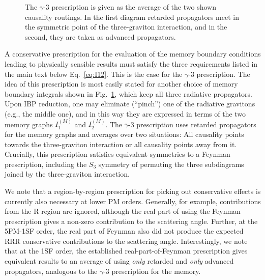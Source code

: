 \documentclass[twocolumn,superscriptaddress,amsmath, amssymb, amsfonts,preprintnumbers,aps,prd,longbibliography,nofootinbib]{revtex4-2}
\begin{document}
\begin{widetext}
\begin{figure}[t!]
\caption{
  The $\gamma$-$3$ prescription is given as the average of the two shown causality routings.
  In the first diagram retarded propagators meet in the symmetric point of the three-graviton interaction, and in the second, they are taken as advanced propagators.
  }
\label{fig:g3pres}
\end{figure}
A conservative prescription for the evaluation of the memory boundary conditions leading to physically sensible results must satisfy the three requirements listed in the main text below Eq.~\eqref{eq:I12}.
This is the case for the $\gamma$-3 prescription.
The idea of this prescription is most easily stated for another choice of memory boundary integrals shown in Fig.~\ref{fig:g3pres}, which keep all three radiative propagators.
Upon IBP reduction, one may eliminate (``pinch'') one of the radiative gravitons (e.g., the middle one), and in this way they are expressed in terms of the two memory graphs $I^{(M)}_1$ and $I^{(M)}_2$.
The $\gamma$-3 prescription uses retarded propagators for the memory graphs and averages over two situations: All causality points towards the three-graviton interaction or all causality points away from it.
Crucially, this prescription satisfies equivalent symmetries to a Feynman prescription, including the $S_3$ symmetry of permuting the three subdiagrams joined by the three-graviton interaction.

We note that a region-by-region prescription for picking out conservative effects is currently also necessary at lower PM orders.
Generally, for example, contributions from the R region are ignored, although the real part of using the Feynman prescription gives a non-zero contribution to the scattering angle.
Further, at the 5PM-1SF order, the real part of Feynman also did not produce the expected RRR conservative contributions to the scattering angle.
Interestingly, we note that at the 1SF order, the established real-part-of-Feynman prescription gives equivalent results to an average of using \textit{only} retarded and \textit{only} advanced propagators, analogous to the $\gamma$-3 prescription for the memory.


\end{widetext}
\end{document}
